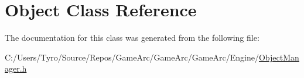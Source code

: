 \hypertarget{class_object}{}\section{Object Class Reference}
\label{class_object}


The documentation for this class was generated from the following file\+:\begin{DoxyCompactItemize}
\item 
C\+:/\+Users/\+Tyro/\+Source/\+Repos/\+Game\+Arc/\+Game\+Arc/\+Game\+Arc/\+Engine/\mbox{\hyperlink{_object_manager_8h}{Object\+Manager.\+h}}\end{DoxyCompactItemize}
